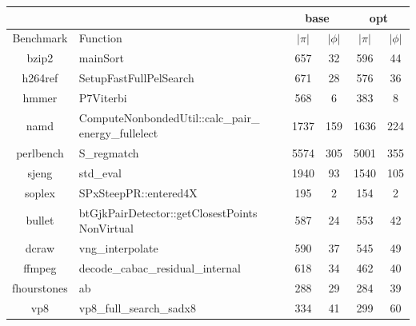 \begin{table}[!t]
\begin{center}
\begin{small}
\begin{tabularx}{0.9\textwidth}{|c|X|c|c|c|c|}
\cline{3-6}
\multicolumn{2}{l|}{} & \multicolumn{2}{c|}{base} & \multicolumn{2}{c|}{opt} \\
\hline
Benchmark & Function & $|\pi|$ & $|\phi|$ & $|\pi|$ & $|\phi|$ \\
\hline
\hline
bzip2 & mainSort & 657 & 32 & 596 & 44 \\
\hline
h264ref & SetupFastFullPelSearch & 671 & 28 & 576 & 36 \\
\hline
hmmer & P7Viterbi & 568 & 6 & 383 & 8 \\
\hline
namd & ComputeNonbondedUtil::calc\_pair\_ energy\_fullelect & 1737 & 159 & 1636 & 224 \\
\hline
perlbench & S\_regmatch & 5574 & 305 & 5001 & 355 \\
\hline
sjeng & std\_eval & 1940 & 93 & 1540 & 105 \\
\hline
soplex & SPxSteepPR::entered4X & 195 & 2 & 154 & 2 \\
\hline
bullet & btGjkPairDetector::getClosestPoints NonVirtual & 587 & 24 & 553 & 42 \\
\hline
dcraw & vng\_interpolate & 590 & 37 & 545 & 49 \\
\hline
ffmpeg & decode\_cabac\_residual\_internal & 618 & 34 & 462 & 40 \\
\hline
fhourstones & ab & 288 & 29 & 284 & 39 \\
\hline
vp8 & vp8\_full\_search\_sadx8 & 334 & 41 & 299 & 60 \\
\hline
\end{tabularx}

\vspace{6mm}


\end{small}
\end{center}
\end{table}

